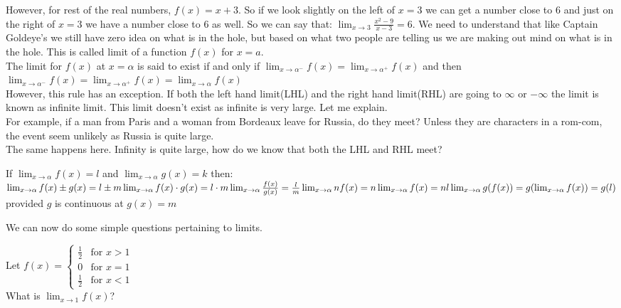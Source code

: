 However, for rest of the real numbers, $f(x)=x+3$. So if we look slightly on the left of $x=3$ we can get a number close to $6$ and just on the right of $x=3$ we have a number close to $6$ as well. So we can say that: $\lim_{x \to 3} \frac{x^2-9}{x-3}=6$. We need to understand that like Captain Goldeye's we still have zero idea on what is in the hole, but based on what two people are telling us we are making out mind on what is in the hole. This is called limit of a function $f(x)$ for $x=a$.\\
The limit for $f(x)$ at $x=\alpha$ is said to exist if and only if $\lim_{x \to \alpha^-} f(x)=\lim_{x \to \alpha^+} f(x)$ and then $\lim_{x \to \alpha^-} f(x)=\lim_{x \to \alpha^+} f(x)=\lim_{x \to \alpha} f(x)$\\
However, this rule has an exception. If both the left hand limit(LHL) and the right hand limit(RHL) are going to $\infty$ or $-\infty$ the limit is known as infinite limit. This limit doesn't exist as infinite is very large. Let me explain.\\
For example, if a man from Paris and a woman from Bordeaux leave for Russia, do they meet? Unless they are characters in a rom-com, the event seem unlikely as Russia is quite large.\\
The same happens here. Infinity is quite large, how do we know that both the LHL and RHL meet?\\
\begin{theorem}
    If $\lim_{x \to \alpha}f(x)=l$ and $\lim_{x \to \alpha}g(x)=k$ then:\\
    $\lim_{x \to \alpha}f(x) \pm g(x)=l \pm m\\
    \lim_{x \to \alpha}f(x) \cdot g(x)=l \cdot m\\
    \lim_{x \to \alpha}\frac{f(x)}{g(x)}=\frac{l}{m}\\
    \lim_{x \to \alpha}nf(x)=n\lim_{x \to \alpha}f(x)=nl\\
    \lim_{x \to \alpha}g(f(x))=g(\lim_{x \to \alpha}f(x))=g(l)$ provided $g$ is continuous at $g(x)=m$
\end{theorem}
We can now do some simple questions pertaining to limits.\\
\begin{example}
    Let $f(x) =
\begin{cases}
    \frac{1}{2} & \text{for } x > 1 \\
    0 & \text{for } x = 1 \\
    \frac{1}{2} & \text{for } x < 1
\end{cases}$\\
What is $\lim_{x \to 1} f(x)$?
\end{example}
